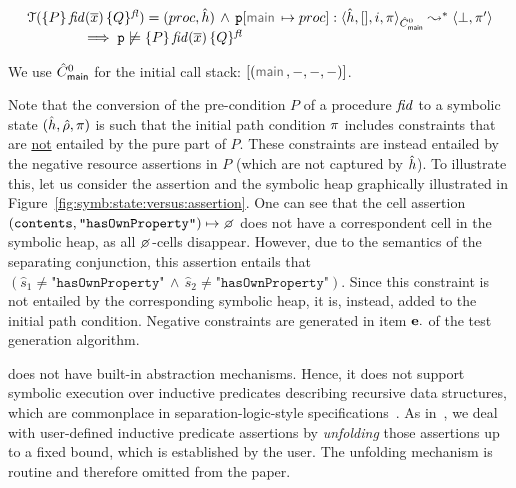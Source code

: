\begin{theorem}\label{teo:bug:finding:sl}
$$
\begin{array}{l}
\testify{}(\specsig{P}{\fid(\jvec{x})}{Q}{\flag})  = (\proc, \sheap) \, \wedge \, 
   \prog[\jsilmain \mapsto \proc] : \symbtranstranserr{\sheap, [], i, \pc}{\sctxmain}{\pc'} \\
  \qquad \qquad \implies
        \prog \not\satisfies \specsig{P}{\fid(\jvec{x})}{Q}{\flag}
\end{array}
$$
\end{theorem}
We use $\hat{C}_{\sf main}^0$ for the initial call stack: $[ (\jsilmain, -, -, -) ]$.


 Note that the conversion of the 
pre-condition $P$ of a \jsil procedure $\mathit{fid}$ to a symbolic state $(\hat{h}, \hat\rho, \pi)$ is such that 
the initial path condition $\pi$ includes constraints that are \underline{not} entailed by the pure part of $P$. 
These constraints are instead entailed by the negative resource assertions in $P$ (which are not captured 
by $\hat{h}$).
To illustrate this, let us consider the assertion and the symbolic heap graphically illustrated
 in Figure~\ref{fig:symb:state:versus:assertion}. One can see that the cell assertion 
 {\small $(\texttt{contents}, \texttt{"hasOwnProperty"}) \mapsto \none$} does not have a correspondent 
 cell in the symbolic heap, as all $\none$-cells disappear. 
 However, due to the semantics of the separating conjunction, this assertion entails that 
{\small $(\hat{s}_1 \neq \texttt{"hasOwnProperty"} \, \wedge \, \hat{s}_2 \neq \texttt{"hasOwnProperty"})$}. 
Since this constraint is not entailed by the corresponding symbolic heap, it is, instead, added to the initial path condition. 
Negative constraints are generated in item ${\bf e.}$ of the test generation algorithm. 

\jilette does not have built-in abstraction mechanisms. Hence, it does not support symbolic
execution over inductive predicates describing recursive data structures, which are 
commonplace in separation-logic-style specifications~\cite{smallf, berdine:aplas:2005}. 
As in~\cite{korat}, we deal with user-defined inductive predicate assertions by \emph{unfolding} 
those assertions up to a fixed bound, which is established by the user. The unfolding mechanism 
is routine and therefore omitted from the paper. 

